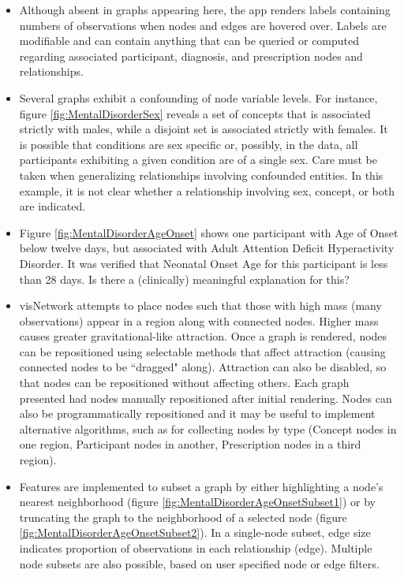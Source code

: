 \documentclass[10pt, letterpaper]{article}
\begin{document}
\begin{spacing}{1.0}
\begin{itemize}
    \item Although absent in graphs appearing here, the app renders labels containing numbers of observations when nodes and edges are hovered over.  Labels are modifiable and can contain anything that can be queried or computed regarding associated participant, diagnosis, and prescription nodes and relationships.
    
    \item Several graphs exhibit a confounding of node variable levels.  For instance, figure \ref{fig:MentalDisorderSex} reveals a set of concepts that is associated strictly with males, while a disjoint set is associated strictly with females.  It is possible that conditions are sex specific or, possibly, in the data, all participants exhibiting a given condition are of a single sex.  Care must be taken when generalizing relationships involving confounded entities.  In this example, it is not clear whether a relationship involving sex, concept, or both are indicated.
    
    \item Figure \ref{fig:MentalDisorderAgeOnset} shows one participant with Age of Onset below twelve days, but associated with Adult Attention Deficit Hyperactivity Disorder.  It was verified that Neonatal Onset Age for this participant is less than 28 days.  Is there a (clinically) meaningful explanation for this?
    
    \item visNetwork attempts to place nodes such that those with high mass (many observations) appear in a region along with connected nodes.  Higher mass causes greater gravitational-like attraction.  Once a graph is rendered, nodes can be repositioned using selectable methods that affect attraction (causing connected nodes to be ``dragged" along).  Attraction can also be disabled, so that nodes can be repositioned without affecting others.  Each graph presented had nodes manually repositioned after initial rendering.  Nodes can also be programmatically repositioned and it may be useful to implement alternative algorithms, such as for collecting nodes by type (Concept nodes in one region, Participant nodes in another, Prescription nodes in a third region).
    
    \item Features are implemented to subset a graph by either highlighting a node's nearest neighborhood (figure \ref{fig:MentalDisorderAgeOnsetSubset1}) or by truncating the graph to the neighborhood of a selected node (figure \ref{fig:MentalDisorderAgeOnsetSubset2}).  In a single-node subset, edge size indicates proportion of observations in each relationship (edge).  Multiple node subsets are also possible, based on user specified node or edge filters.
    

\end{itemize}
\end{spacing}
\end{document}
